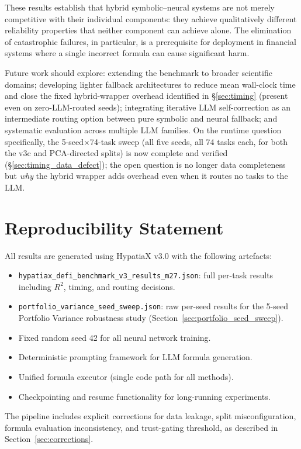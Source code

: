 \documentclass[twoside,11pt]{article}
\newcommand{\Rsq}{R^{2}}
\begin{document}
These results establish that hybrid symbolic--neural systems are not merely
competitive with their individual components: they achieve qualitatively different
reliability properties that neither component can achieve alone.  The elimination
of catastrophic failures, in particular, is a prerequisite for deployment in
financial systems where a single incorrect formula can cause significant harm.

Future work should explore: extending the benchmark to broader scientific domains;
developing lighter fallback architectures to reduce mean wall-clock time and
close the fixed hybrid-wrapper overhead identified in
\S\ref{sec:timing} (present even on zero-LLM-routed seeds);
integrating iterative LLM self-correction as an intermediate routing option between
pure symbolic and neural fallback; and systematic evaluation across multiple LLM
families. On the runtime question specifically, the 5-seed$\times$74-task
sweep (all five seeds, all 74 tasks each, for both the v3c and
PCA-directed splits) is now complete and verified
(\S\ref{sec:timing_data_defect}); the open question is no longer data
completeness but \emph{why} the hybrid wrapper adds overhead even when it
routes no tasks to the LLM.

\section*{Reproducibility Statement}

All results are generated using HypatiaX v3.0 with the following artefacts:
\begin{itemize}
  \item \texttt{hypatiax\_defi\_benchmark\_v3\_results\_m27.json}: full per-task
    results including $\Rsq$, timing, and routing decisions.
  \item \texttt{portfolio\_variance\_seed\_sweep.json}: raw per-seed results for
    the 5-seed Portfolio Variance robustness study (Section~\ref{sec:portfolio_seed_sweep}).
  \item Fixed random seed 42 for all neural network training.
  \item Deterministic prompting framework for LLM formula generation.
  \item Unified formula executor (single code path for all methods).
  \item Checkpointing and resume functionality for long-running experiments.
\end{itemize}
The pipeline includes explicit corrections for data leakage, split misconfiguration,
formula evaluation inconsistency, and trust-gating threshold, as described in
Section~\ref{sec:corrections}.
\end{document}
